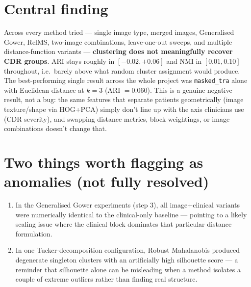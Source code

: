 \documentclass[11pt]{article}
\newcommand{\code}[1]{\texttt{#1}}
\begin{document}
\section*{Central finding}
Across every method tried --- single image type, merged images, Generalised Gower, RelMS,
two-image combinations, leave-one-out sweeps, and multiple distance-function variants ---
\textbf{clustering does not meaningfully recover CDR groups}. ARI stays roughly in
$[-0.02, +0.06]$ and NMI in $[0.01, 0.10]$ throughout, i.e.\ barely above what random cluster
assignment would produce. The best-performing single result across the whole project was
\code{masked\_tra} alone with Euclidean distance at $k=3$ (ARI $=0.060$). This is a genuine
negative result, not a bug: the same features that separate patients geometrically (image
texture/shape via HOG+PCA) simply don't line up with the axis clinicians use (CDR severity), and
swapping distance metrics, block weightings, or image combinations doesn't change that.

\section*{Two things worth flagging as anomalies (not fully resolved)}
\begin{enumerate}[leftmargin=1.4em, itemsep=0.3em]
  \item In the Generalised Gower experiments (step 3), all image+clinical variants were
  numerically identical to the clinical-only baseline --- pointing to a likely scaling issue where
  the clinical block dominates that particular distance formulation.
  \item In one Tucker-decomposition configuration, Robust Mahalanobis produced degenerate
  singleton clusters with an artificially high silhouette score --- a reminder that silhouette
  alone can be misleading when a method isolates a couple of extreme outliers rather than finding
  real structure.
\end{enumerate}
\end{document}
